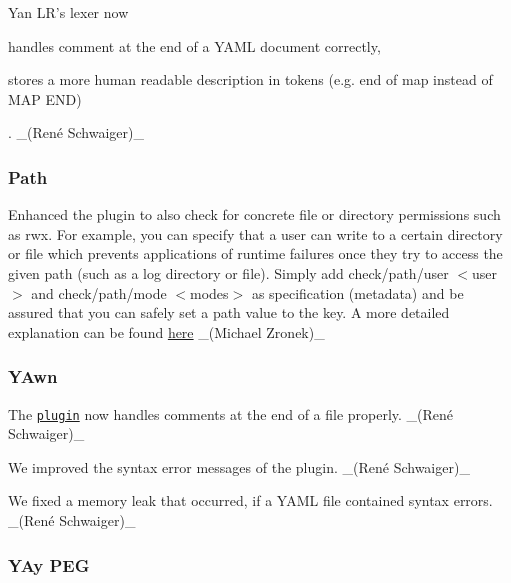 \begin{DoxyItemize}
\item Yan L\+R’s lexer now
\begin{DoxyItemize}
\item handles comment at the end of a Y\+A\+ML document correctly,
\item stores a more human readable description in tokens (e.\+g. {\ttfamily end of map} instead of {\ttfamily M\+AP E\+ND})
\end{DoxyItemize}

. \+\_\+(René Schwaiger)\+\_\+
\end{DoxyItemize}

\subsubsection*{Path}

Enhanced the plugin to also check for concrete file or directory permissions such as {\ttfamily rwx}. For example, you can specify that a user can write to a certain directory or file which prevents applications of runtime failures once they try to access the given path (such as a log directory or file). Simply add {\ttfamily check/path/user $<$user$>$} and {\ttfamily check/path/mode $<$modes$>$} as specification (metadata) and be assured that you can safely set a path value to the key. A more detailed explanation can be found \hyperlink{md_src_plugins_path_README_src_plugins_path_README_md}{here} \+\_\+(\+Michael Zronek)\+\_\+

\subsubsection*{Y\+Awn}


\begin{DoxyItemize}
\item The \href{https://www.libelektra.org/plugins/yawn}{\tt plugin} now handles comments at the end of a file properly. \+\_\+(René Schwaiger)\+\_\+
\item We improved the syntax error messages of the plugin. \+\_\+(René Schwaiger)\+\_\+
\item We fixed a memory leak that occurred, if a Y\+A\+ML file contained syntax errors. \+\_\+(René Schwaiger)\+\_\+
\end{DoxyItemize}

\subsubsection*{Y\+Ay P\+EG}


